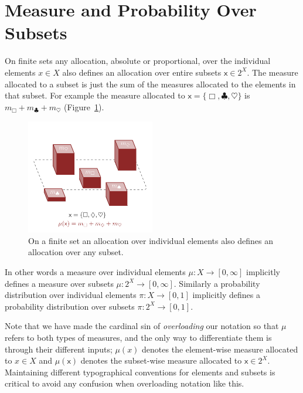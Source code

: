 \documentclass[
  letterpaper,
  DIV=11,
  numbers=noendperiod]{scrartcl}
\begin{document}
\hypertarget{measure-and-probability-over-subsets}{%
\section{Measure and Probability Over
Subsets}\label{measure-and-probability-over-subsets}}

On finite sets any allocation, absolute or proportional, over the
individual elements \(x \in X\) also defines an allocation over entire
subsets \(\mathsf{x} \in 2^{X}\). The measure allocated to a subset is
just the sum of the measures allocated to the elements in that subset.
For example the measure allocated to
\(\mathsf{x} = \{ \Box, \clubsuit, \heartsuit \}\) is
\(m_{\Box} + m_{\clubsuit} + m_{\heartsuit}\)
(Figure~\ref{fig-subset_measure}).

\begin{figure}

{\centering \includegraphics[width=0.5\textwidth,height=\textheight]{figures/subset_measure/subset_measure.pdf}

}

\caption{\label{fig-subset_measure}On a finite set an allocation over
individual elements also defines an allocation over any subset.}

\end{figure}

In other words a measure over individual elements
\(\mu : X \rightarrow [0, \infty]\) implicitly defines a measure over
subsets \(\mu : 2^{X} \rightarrow [0, \infty]\). Similarly a probability
distribution over individual elements \(\pi : X \rightarrow [0, 1]\)
implicitly defines a probability distribution over subsets
\(\pi : 2^{X} \rightarrow [0, 1]\).

Note that we have made the cardinal sin of \emph{overloading} our
notation so that \(\mu\) refers to both types of measures, and the only
way to differentiate them is through their different inputs; \(\mu(x)\)
denotes the element-wise measure allocated to \(x \in X\) and
\(\mu( \mathsf{x} )\) denotes the subset-wise measure allocated to
\(\mathsf{x} \in 2^X\). Maintaining different typographical conventions
for elements and subsets is critical to avoid any confusion when
overloading notation like this.
\end{document}
